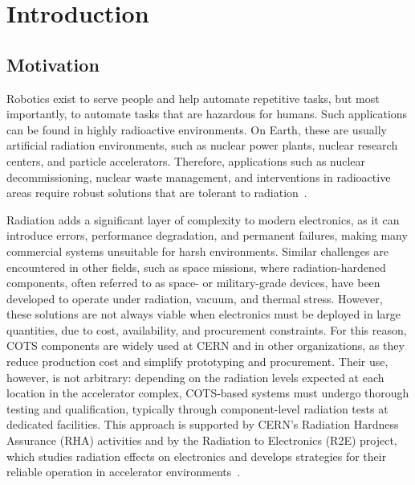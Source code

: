 \chapter{Introduction}
\label{chapter:introduction}

\section{Motivation}
\label{section:motivation}

Robotics exist to serve people and help automate repetitive tasks, but most importantly, to automate tasks that are hazardous for humans. Such applications can be found in highly radioactive environments. On Earth, these are usually artificial radiation environments, such as nuclear power plants, nuclear research centers, and particle accelerators. Therefore, applications such as nuclear decommissioning, nuclear waste management, and interventions in radioactive areas require robust solutions that are tolerant to radiation~\cite{DiCastro2018CERNTAURO, Tsiligiannis2020Evaluation}.

Radiation adds a significant layer of complexity to modern electronics, as it can introduce errors, performance degradation, and permanent failures, making many commercial systems unsuitable for harsh environments. Similar challenges are encountered in other fields, such as space missions, where radiation-hardened components, often referred to as space- or military-grade devices, have been developed to operate under radiation, vacuum, and thermal stress. However, these solutions are not always viable when electronics must be deployed in large quantities, due to cost, availability, and procurement constraints. For this reason, COTS components are widely used at CERN and in other organizations, as they reduce production cost and simplify prototyping and procurement. Their use, however, is not arbitrary: depending on the radiation levels expected at each location in the accelerator complex, COTS-based systems must undergo thorough testing and qualification, typically through component-level radiation tests at dedicated facilities. This approach is supported by CERN’s Radiation Hardness Assurance (RHA) activities and by the Radiation to Electronics (R2E) project, which studies radiation effects on electronics and develops strategies for their reliable operation in accelerator environments~\cite{Tsiligiannis2020Evaluation, Ferraro2020COTS, GarciaAlia2018LHC, ratopus_jacow, Coronetti2021Radiation}.

